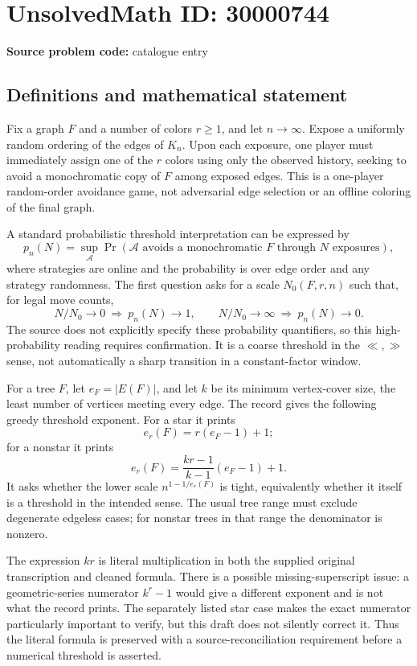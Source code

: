 \documentclass[11pt]{article}
\begin{document}
\section*{UnsolvedMath ID: 30000744}
\textbf{Source problem code:} catalogue entry
\subsection{Definitions and mathematical statement}
Fix a graph \(F\) and a number of colors \(r\geq1\), and let \(n\to\infty\). Expose a uniformly random ordering of the edges of \(K_n\). Upon each exposure, one player must immediately assign one of the \(r\) colors using only the observed history, seeking to avoid a monochromatic copy of \(F\) among exposed edges. This is a one-player random-order avoidance game, not adversarial edge selection or an offline coloring of the final graph.

A standard probabilistic threshold interpretation can be expressed by
\[
p_n(N)=\sup_{\mathcal A}\Pr(\mathcal A\text{ avoids a monochromatic }F\text{ through }N\text{ exposures}),
\]
where strategies are online and the probability is over edge order and any strategy randomness. The first question asks for a scale \(N_0(F,r,n)\) such that, for legal move counts,
\[
N/N_0\to0\ \Longrightarrow\ p_n(N)\to1,
\qquad
N/N_0\to\infty\ \Longrightarrow\ p_n(N)\to0.
\]
The source does not explicitly specify these probability quantifiers, so this high-probability reading requires confirmation. It is a coarse threshold in the \(\ll,\gg\) sense, not automatically a sharp transition in a constant-factor window.

For a tree \(F\), let \(e_F=|E(F)|\), and let \(k\) be its minimum vertex-cover size, the least number of vertices meeting every edge. The record gives the following greedy threshold exponent. For a star it prints
\[
e_r(F)=r(e_F-1)+1;
\]
for a nonstar it prints
\[
e_r(F)=\frac{kr-1}{k-1}(e_F-1)+1.
\]
It asks whether the lower scale \(n^{1-1/e_r(F)}\) is tight, equivalently whether it itself is a threshold in the intended sense. The usual tree range must exclude degenerate edgeless cases; for nonstar trees in that range the denominator is nonzero.

The expression \(kr\) is literal multiplication in both the supplied original transcription and cleaned formula. There is a possible missing-superscript issue: a geometric-series numerator \(k^r-1\) would give a different exponent and is not what the record prints. The separately listed star case makes the exact numerator particularly important to verify, but this draft does not silently correct it. Thus the literal formula is preserved with a source-reconciliation requirement before a numerical threshold is asserted.
\end{document}
